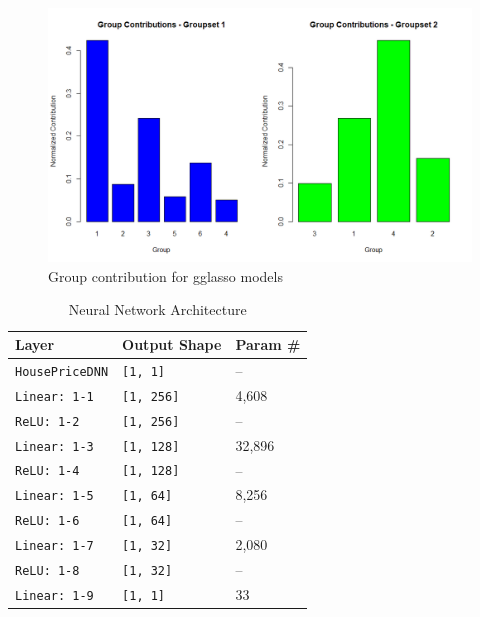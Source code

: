\documentclass[a4paper, 11pt]{article}
\begin{document}
\begin{figure}[H]
\includegraphics[scale=0.55]{gglassocontrib}
\centering
\caption{Group contribution for gglasso models}
\label{fig:gglassocontrib}
\end{figure}


\begin{table}[H]
\centering
\begin{tabular}{|l|l|l|}
\hline
\textbf{Layer} & \textbf{Output Shape} & \textbf{Param \#} \\ \hline
\texttt{HousePriceDNN} & \texttt{[1, 1]} & -- \\ \hline
\texttt{Linear: 1-1} & \texttt{[1, 256]} & 4,608 \\ \hline
\texttt{ReLU: 1-2} & \texttt{[1, 256]} & -- \\ \hline
\texttt{Linear: 1-3} & \texttt{[1, 128]} & 32,896 \\ \hline
\texttt{ReLU: 1-4} & \texttt{[1, 128]} & -- \\ \hline
\texttt{Linear: 1-5} & \texttt{[1, 64]} & 8,256 \\ \hline
\texttt{ReLU: 1-6} & \texttt{[1, 64]} & -- \\ \hline
\texttt{Linear: 1-7} & \texttt{[1, 32]} & 2,080 \\ \hline
\texttt{ReLU: 1-8} & \texttt{[1, 32]} & -- \\ \hline
\texttt{Linear: 1-9} & \texttt{[1, 1]} & 33 \\ \hline
\end{tabular}
\caption{Neural Network Architecture}
\label{tab:NN}
\end{table}
\end{document}
